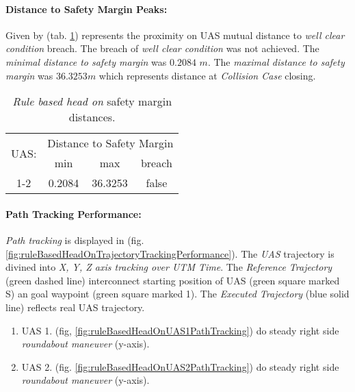 \paragraph{Distance to Safety Margin Peaks:} Given by (tab. \ref{tab:testCaseRuleBasedHeadOnSafetyMarginDistances}) represents the proximity on UAS mutual distance to \emph{well clear condition} breach. The breach of \emph{well clear condition} was not achieved. The \emph{minimal distance to safety margin} was $0.2084$ $m$. The \emph{maximal distance to safety margin} was $36.3253 m$ which represents distance at \emph{Collision Case} closing. 

\begin{table}[H]
    \centering
    \begin{tabular}{c||c|c|c}
        \multirow{2}{*}{UAS:} & \multicolumn{3}{c}{Distance to Safety Margin} \\ \cline{2-4} 
                  & min          & max         & breach         \\ \hline\hline
            1-2   & 0.2084       & 36.3253     & false          \\ 
    \end{tabular}
    \caption{\emph{Rule based head on} safety margin distances.}
    \label{tab:testCaseRuleBasedHeadOnSafetyMarginDistances}
\end{table}

\paragraph{Path Tracking Performance:} \emph{Path tracking} is displayed in (fig. \ref{fig:ruleBasedHeadOnTrajectoryTrackingPerformance}). The \emph{UAS} trajectory is divined into \emph{X, Y, Z axis tracking over UTM Time}. The \emph{Reference Trajectory} (green dashed line) interconnect starting position of UAS (green square marked S) an goal waypoint (green square marked 1). The \emph{Executed Trajectory} (blue solid line) reflects real UAS trajectory. 

\begin{enumerate}
    \item UAS 1. (fig, \ref{fig:ruleBasedHeadOnUAS1PathTracking}) do steady right side \emph{roundabout maneuver} (y-axis).
    
    \item UAS 2. (fig. \ref{fig:ruleBasedHeadOnUAS2PathTracking}) do steady right side \emph{roundabout maneuver} (y-axis).
\end{enumerate}

